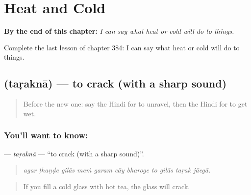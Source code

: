 
\chapter{Heat and Cold}
\label{ch:hi-heat-and-cold}

\begin{chapteropening}
\textbf{By the end of this chapter:} \emph{I can say what heat or cold will do to things.}

Complete the last lesson of chapter 384: I can say what heat or cold will do to things.
\end{chapteropening}

\section[\texorpdfstring{\hi{तड़कना} (taṛaknā)}{तड़कना (taṛaknā)}]{ (taṛaknā) — to crack (with a sharp sound)}

\label{lesson:HI-C384-tarakna}



\begin{quote}
Before the new one: say the Hindi for to unravel, then the Hindi for to get wet.
\end{quote}

\subsection*{You'll want to know: }
\textbf{} — \emph{taṛaknā} — \textquotedblleft{}to crack (with a sharp sound)\textquotedblright{}.

\begin{quote}
          
\end{quote}

\begin{quote}
\emph{agar ṭhaṇḍe gilās meṁ garam cāy bharoge to gilās taṛak jāegā.}
\end{quote}

\begin{quote}
If you fill a cold glass with hot tea, the glass will crack.
\end{quote}

